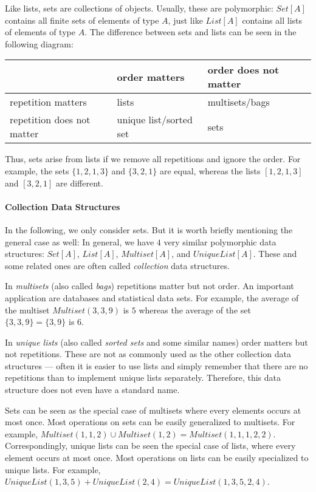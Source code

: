 Like lists, sets are collections of objects.
Usually, these are polymorphic: $Set[A]$ contains all finite sets of elements of type $A$, just like $List[A]$ contains all lists of elements of type $A$.
The difference between sets and lists can be seen in the following diagram:

\begin{center}
\begin{tabular}{|l||l|l|}
\hline
& order matters & order does not matter \\
\hline\hline
repetition matters & lists & multisets/bags \\
repetition does not matter & unique list/sorted set & sets \\
\hline
\end{tabular}
\end{center}

Thus, sets arise from lists if we remove all repetitions and ignore the order.
For example, the sets $\{1,2,1,3\}$ and $\{3,2,1\}$ are equal, whereas the lists $[1,2,1,3]$ and $[3,2,1]$ are different.

\paragraph{Collection Data Structures}
In the following, we only consider sets.
But it is worth briefly mentioning the general case as well:
In general, we have $4$ very similar polymorphic data structures: $Set[A]$, $List[A]$, $Multiset[A]$, and $UniqueList[A]$.
These and some related ones are often called \emph{collection} data structures.

In \emph{multisets} (also called \emph{bags}) repetitions matter but not order.
An important application are databases and statistical data sets.
For example, the average of the multiset $Multiset(3,3,9)$ is $5$ whereas the average of the set $\{3,3,9\}=\{3,9\}$ is $6$.

In \emph{unique lists} (also called \emph{sorted sets} and some similar names) order matters but not repetitions.
These are not as commonly used as the other collection data structures --- often it is easier to use lists and simply remember that there are no repetitions than to implement unique lists separately.
Therefore, this data structure does not even have a standard name.

Sets can be seen as the special case of multisets where every elements occurs at most once.
Most operations on sets can be easily generalized to multisets.
For example, $Multiset(1,1,2)\cup Multiset(1,2)=Multiset(1,1,1,2,2)$.
Correspondingly, unique lists can be seen the special case of lists, where every element occurs at most once.
Most operations on lists can be easily specialized to unique lists.
For example, $UniqueList(1,3,5)+UniqueList(2,4)=UniqueList(1,3,5,2,4)$.

